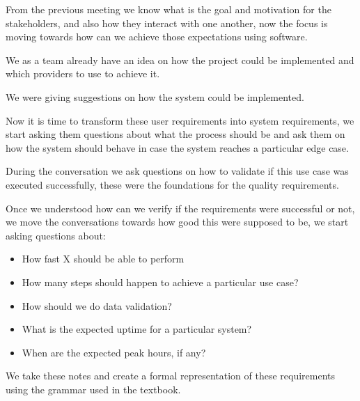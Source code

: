 \noindent From the previous meeting we know what is the goal and motivation 
for the stakeholders, and also how they interact with one another, now the 
focus is moving towards how can we achieve those expectations 
using software. \newline

\noindent We as a team already have an idea on how the project could be 
implemented and which providers to use to achieve it. \newline

\noindent We were giving suggestions on how the system could be implemented. \newline

\noindent Now it is time to transform these user requirements into system 
requirements, we start asking them questions about what the process should be 
and ask them on how the system should behave in case the system reaches a 
particular edge case. \newline

\noindent During the conversation we ask questions on how to validate if this use case 
was executed successfully, these were the foundations for the 
quality requirements. \newline

\pagebreak

\noindent Once we understood how can we verify if the requirements were 
successful or not, we move the conversations towards how good this were 
supposed to be, we start asking questions about:
\begin{itemize}
    \item How fast X should be able to perform
    \item How many steps should happen to achieve a particular use case?
    \item How should we do data validation?
    \item What is the expected uptime for a particular system?
    \item When are the expected peak hours, if any?
\end{itemize}

\noindent We take these notes and create a formal representation of these requirements 
using the grammar used in the textbook.




